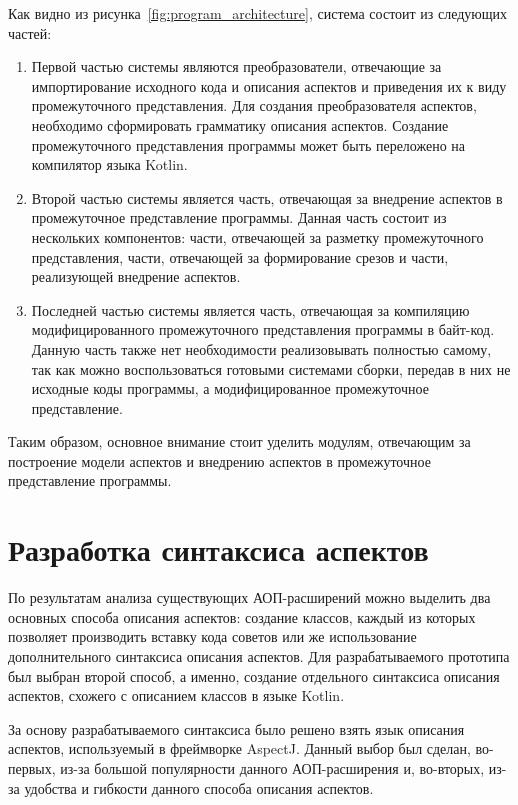 Как видно из рисунка~\ref{fig:program_architecture}, система состоит из
следующих частей:
\begin{enumerate}
	\item Первой частью системы являются преобразователи, отвечающие за
		 импортирование исходного кода и описания аспектов и приведения их к
		 виду промежуточного представления.
		 Для создания преобразователя аспектов, необходимо сформировать
		 грамматику описания аспектов.
		 Создание промежуточного представления программы может быть переложено
		 на компилятор языка Kotlin.
	\item Второй частью системы является часть, отвечающая за внедрение аспектов
		в промежуточное представление программы.
		Данная часть состоит из нескольких компонентов: части, отвечающей за
		разметку промежуточного представления, части, отвечающей за формирование
		срезов и части, реализующей внедрение аспектов.
	\item Последней частью системы является часть, отвечающая за компиляцию
		модифицированного промежуточного представления программы в байт-код.
		Данную часть также нет необходимости реализовывать полностью самому, так
		как можно воспользоваться готовыми системами сборки, передав в них
		не исходные коды программы, а модифицированное промежуточное
		представление.
\end{enumerate}

Таким образом, основное внимание стоит уделить модулям, отвечающим за построение
модели аспектов и внедрению аспектов в промежуточное представление программы.
\section{Разработка синтаксиса аспектов}
\label{sec:aspect_syntax_design}
По результатам анализа существующих АОП-расширений можно выделить два основных
способа описания аспектов: создание классов, каждый из которых позволяет
производить вставку кода советов или же использование дополнительного синтаксиса
описания аспектов.
Для разрабатываемого прототипа был выбран второй способ, а именно, создание
отдельного синтаксиса описания аспектов, схожего с описанием классов в языке
Kotlin.

За основу разрабатываемого синтаксиса было решено взять язык описания аспектов,
используемый в фреймворке AspectJ.
Данный выбор был сделан, во-первых, из-за большой популярности данного
АОП-расширения и, во-вторых, из-за удобства и гибкости данного способа описания
аспектов.
